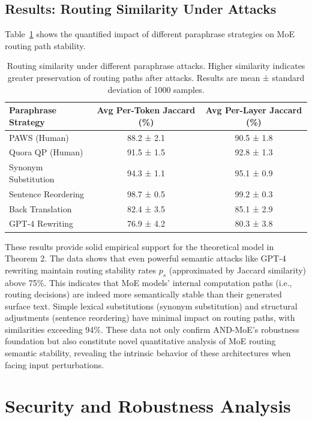 \documentclass[letterpaper,twocolumn,10pt]{article}
\begin{document}
\subsection{Results: Routing Similarity Under Attacks}

Table~\ref{tab:routing_similarity} shows the quantified impact of different paraphrase strategies on MoE routing path stability.

\begin{table}[t]
\centering
\small
\begin{tabular}{|l|c|c|}
\hline
\textbf{Paraphrase Strategy} & \textbf{Avg Per-Token Jaccard (\%)} & \textbf{Avg Per-Layer Jaccard (\%)} \\
\hline
PAWS (Human) & 88.2 ± 2.1 & 90.5 ± 1.8 \\
Quora QP (Human) & 91.5 ± 1.5 & 92.8 ± 1.3 \\
Synonym Substitution & 94.3 ± 1.1 & 95.1 ± 0.9 \\
Sentence Reordering & 98.7 ± 0.5 & 99.2 ± 0.3 \\
Back Translation & 82.4 ± 3.5 & 85.1 ± 2.9 \\
GPT-4 Rewriting & 76.9 ± 4.2 & 80.3 ± 3.8 \\
\hline
\end{tabular}
\caption{Routing similarity under different paraphrase attacks. Higher similarity indicates greater preservation of routing paths after attacks. Results are mean ± standard deviation of 1000 samples.}
\label{tab:routing_similarity}
\end{table}

These results provide solid empirical support for the theoretical model in Theorem 2. The data shows that even powerful semantic attacks like GPT-4 rewriting maintain routing stability rates $p_s$ (approximated by Jaccard similarity) above 75\%. This indicates that MoE models' internal computation paths (i.e., routing decisions) are indeed more semantically stable than their generated surface text. Simple lexical substitutions (synonym substitution) and structural adjustments (sentence reordering) have minimal impact on routing paths, with similarities exceeding 94\%. These data not only confirm AND-MoE's robustness foundation but also constitute novel quantitative analysis of MoE routing semantic stability, revealing the intrinsic behavior of these architectures when facing input perturbations.

\section{Security and Robustness Analysis}
\end{document}

